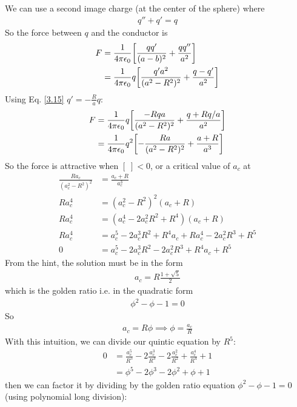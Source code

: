 \documentclass[../main.tex]{subfiles}
\begin{document}
We can use a second image charge (at the center of the sphere) where
\begin{align*}
    q'' + q' = q
\end{align*}
So the force between $q$ and the conductor is
\begin{align*}
    F &= \ke \qt[
        \frac{qq'}{(a - b)^2} + \frac{qq''}{a^2}
    ] \\
    &= \ke q \qt[
        \frac{q' a^2}{(a^2 - R^2)^2} + \frac{q - q'}{a^2}
    ]
\end{align*}
Using Eq. \eqref{3.15} $q' = -\frac{R}{a} q$:
\begin{align*}
    F &= \ke q \qt[
        \frac{-Rq a}{(a^2 - R^2)^2} + \frac{q + Rq / a}{a^2}
    ] \\
    &= \ke q^2 \qt[
        -\frac{Ra}{(a^2 - R^2)^2} + \frac{a + R}{a^3}
    ]
\end{align*}
So the force is attractive when $[\;] < 0$, or a critical value of $a_c$ at
\begin{align*}
    \frac{Ra_c}{(a_c^2 - R^2)^2} &= \frac{a_c + R}{a_c^3} \\
    Ra_c^4 &= (a_c^2 - R^2)^2 (a_c + R) \\
    Ra_c^4 &= (a_c^4 - 2a_c^2 R^2 + R^4) (a_c + R) \\
    Ra_c^4 &= a_c^5 - 2a_c^3 R^2 + R^4 a_c + R a_c^4 - 2a_c^2 R^3 + R^5 \\
    0 &= a_c^5 - 2a_c^3 R^2 - 2a_c^2 R^3 + R^4 a_c + R^5
\end{align*}
From the hint, the solution must be in the form
\begin{align*}
    a_c = R \frac{1 + \sqrt{5}}{2}
\end{align*}
which is the golden ratio i.e. in the quadratic form
\begin{align*}
    \phi^2 - \phi - 1 = 0
\end{align*}
So
\begin{align*}
    a_c = R \phi \implies \phi = \frac{a_c}{R}
\end{align*}
With this intuition, we can divide our quintic equation by $R^5$:
\begin{align*}
    0 &= \frac{a_c^5}{R^5} - 2\frac{a_c^3}{R^3} - 2\frac{a_c^2}{R^2} + \frac{a_c^4}{R^4} + 1 \\
    &= \phi^5 - 2\phi^3  - 2\phi^2 + \phi + 1
\end{align*}
then we can factor it by dividing by the golden ratio equation $\phi^2 - \phi - 1 = 0$ (using polynomial long division):
\end{document}
